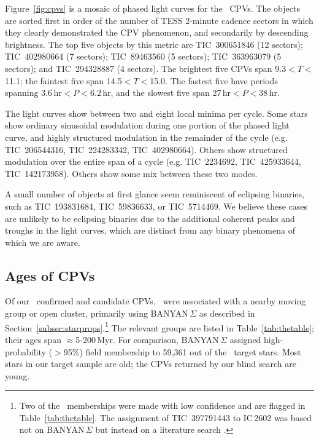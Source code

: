 \documentclass[11pt,twocolumn,tighten,linenumbers]{aastex63}
\begin{document}
Figure~\ref{fig:cpvs} is a mosaic of phased light curves for the
\ngoods\ CPVs.  The objects are sorted first in order of the number of
TESS 2-minute cadence sectors in which they clearly demonstrated the
CPV phenomenon, and secondarily by descending brightness.  The top
five objects by this metric are TIC~300651846 (12 sectors);
TIC~402980664 (7 sectors); TIC~89463560 (5 sectors); TIC~363963079 (5
sectors); and TIC~294328887 (4 sectors).  The brightest five CPVs span
9.3$<$$T$$<$11.1; the faintest five span 14.5$<$$T$$<$15.0.  The
fastest five have periods spanning 3.6\,hr$<$$P$$<$6.2\,hr, and the
slowest five span 27\,hr$<$$P$$<$38\,hr.

The light curves show between two and eight local minima per cycle.
Some stars show ordinary sinusoidal modulation during one portion of
the phased light curve, and highly structured modulation in the
remainder of the cycle (e.g. TIC~206544316, TIC~224283342,
TIC~402980664).  Others show structured modulation over the entire
span of a cycle (e.g. TIC~2234692, TIC~425933644, TIC~142173958).
Others show some mix between these two modes.

A small number of objects at first glance seem reminiscent of
eclipsing binaries, such as TIC~193831684, TIC~59836633, or
TIC~5714469.  We believe these cases are unlikely to be eclipsing
binaries due to the additional coherent peaks and troughs in the light
curves, which are distinct from any binary phenomena of which we are
aware.



\subsection{Ages of CPVs}
\label{subsec:ageresults}

Of our \ncqvsnodebunked\ confirmed and candidate CPVs,
\nnotfieldbanyan\ were associated with a nearby moving group or open
cluster, primarily using BANYAN\,$\Sigma$ as described in
Section~\ref{subsec:starprops}.\footnote{Two of the \nnotfieldbanyan\
memberships were made with low confidence and are flagged in
Table~\ref{tab:thetable}.  The assignment of TIC~397791443 to IC\,2602
was based not on BANYAN\,$\Sigma$ but instead on a literature search
\citep[e.g.][]{2020A&A...633A..99C}.}  The relevant groups are listed
in Table~\ref{tab:thetable}; their ages span $\approx$5-200\,Myr.  For
comparison, BANYAN\,$\Sigma$ assigned high-probability ($>$95\%) field
membership to 59{,}361 out of the \nstarssearched\ target stars.  Most
stars in our target sample are old; the CPVs returned by our blind
search are young.
\end{document}
